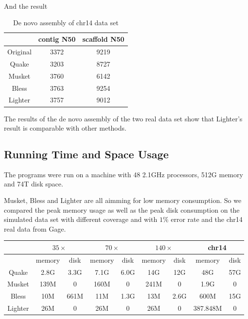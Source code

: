 \documentclass[10pt]{article}
\begin{document}
And the result 

\begin{table}
\begin{tabular}{|c|c|c|} \hline
		& contig N50	& scaffold N50 \\ \hline
Original	& 3372	& 9219 \\ \hline
Quake	& 3203	& 8727 \\ \hline
Musket	& 3760	& 6142 \\ \hline
Bless	& 3763	& 9254 \\ \hline
Lighter	&  3757	& 9012 \\ \hline
\end{tabular}
\caption{De novo assembly of chr14 data set\label{table:chr14}}
\end{table}

The results of the de novo assembly of the two real data set show that Lighter's result is comparable with other methods.

\subsection*{Running Time and Space Usage}
The programs were run on a machine with 48 2.1GHz processors, 512G memory and 74T disk space. 

Musket, Bless and Lighter are all aimming for low memory consumption. So we compared the peak memory usage as well as the peak disk consumption on the simulated data set with different coverage and with $1\%$ error rate and the chr14 real data from Gage.

\begin{tabular}{|c|c|c||c|c||c|c||c|c|} \hline
		& \multicolumn{2}{|c||}{$35\times$} & \multicolumn{2}{|c||}{$70\times$}  & \multicolumn{2}{|c||}{$140\times$} & \multicolumn{2}{|c|}{chr14}  \\ \hline
		& memory & disk & memory & disk & memory & disk & memory & disk \\ \hline
Quake   & 2.8G	& 3.3G & 7.1G & 6.0G & 14G & 12G & 48G & 57G \\ \hline		
Musket	& 139M	& 0 & 160M & 0 & 241M & 0 & 1.9G & 0 \\ \hline
Bless	& 10M	& 661M & 11M & 1.3G & 13M & 2.6G & 600M & 15G \\ \hline
Lighter	& 26M	& 0 & 26M & 0 & 26M & 0 & 387.848M & 0 \\ \hline
\end{tabular}
\end{document}
